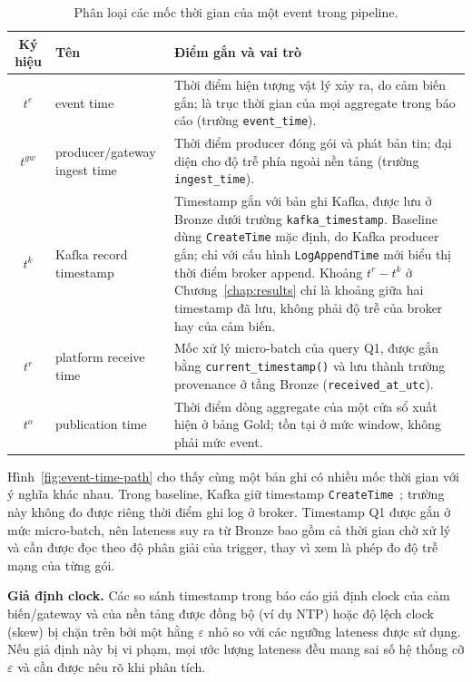 \begin{table}[H]
\centering
\caption{Phân loại các mốc thời gian của một event trong pipeline.}
\label{tab:time-taxonomy}
\begin{tabularx}{\textwidth}{c l X}
\toprule
\textbf{Ký hiệu} & \textbf{Tên} & \textbf{Điểm gắn và vai trò} \\
\midrule
$t^{e}$ & event time &
  Thời điểm hiện tượng vật lý xảy ra, do cảm biến gắn; là trục thời gian
  của mọi aggregate trong báo cáo (trường \texttt{event\_time}). \\
$t^{gw}$ & producer/gateway ingest time &
  Thời điểm producer đóng gói và phát bản tin; đại diện cho độ trễ phía
  ngoài nền tảng (trường \texttt{ingest\_time}). \\
$t^{k}$ & Kafka record timestamp &
  Timestamp gắn với bản ghi Kafka, được lưu ở Bronze dưới trường
  \texttt{kafka\_timestamp}. Baseline dùng \texttt{CreateTime} mặc định,
  do Kafka producer gắn; chỉ với cấu hình \texttt{LogAppendTime} mới
  biểu thị thời điểm broker append. Khoảng $t^{r}-t^{k}$ ở
  Chương~\ref{chap:results} chỉ là khoảng giữa hai timestamp đã lưu, không
  phải độ trễ của broker hay của cảm biến. \\
$t^{r}$ & platform receive time &
  Mốc xử lý micro-batch của query Q1, được gắn bằng
  \texttt{current\_timestamp()} và lưu thành trường provenance ở tầng
  Bronze (\texttt{received\_at\_utc}). \\
$t^{o}$ & publication time &
  Thời điểm dòng aggregate của một cửa sổ xuất hiện ở bảng Gold; tồn tại
  ở mức window, không phải mức event. \\
\bottomrule
\end{tabularx}
\end{table}



Hình~\ref{fig:event-time-path} cho thấy cùng một bản ghi có nhiều mốc
thời gian với ý nghĩa khác nhau. Trong baseline, Kafka giữ timestamp
\texttt{CreateTime}~\cite{kafka_docs_4_3}; trường này không đo được riêng
thời điểm ghi log ở broker. Timestamp Q1 được gắn ở mức micro-batch, nên
lateness suy ra từ Bronze bao gồm cả thời gian chờ xử lý và cần được đọc
theo độ phân giải của trigger, thay vì xem là phép đo độ trễ mạng của từng
gói.

\textbf{Giả định clock.} Các so sánh timestamp trong báo cáo giả định clock
của cảm biến/gateway và của nền tảng được đồng bộ (ví dụ NTP) hoặc độ lệch
clock (skew) bị chặn trên bởi một hằng $\varepsilon$ nhỏ so với các ngưỡng
lateness được sử dụng. Nếu giả định này bị vi phạm, mọi ước lượng lateness
đều mang sai số hệ thống cỡ $\varepsilon$ và cần được nêu rõ khi phân tích.

